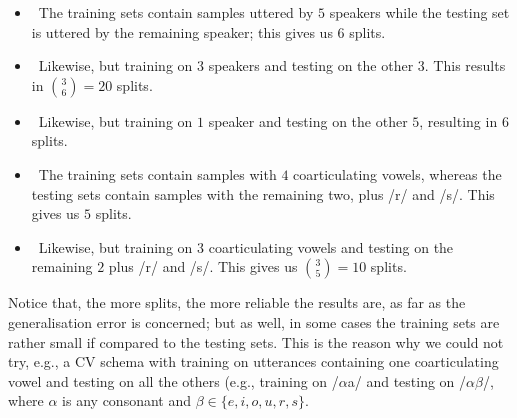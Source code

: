 \begin{itemize}

  \item \spka\ The training sets contain samples
  	uttered by $5$ speakers while the testing set is
  	uttered by the remaining speaker; this gives us $6$ splits.

  \item \spkb\ Likewise, but training on $3$ speakers and testing on the
  	other $3$. This results in $\binom{3}{6} = 20$ splits.

  \item \spkc\ Likewise, but training on $1$ speaker and testing on the
  	other $5$, resulting in $6$ splits.

  \item \coa\ The training sets contain samples
  	with $4$ coarticulating vowels, whereas the testing sets contain samples
  	with the remaining two, plus /r/ and /s/. This gives us $5$ splits.

  \item \cob\ Likewise, but training on $3$ coarticulating vowels and
  	testing on the remaining $2$ plus /r/ and /s/. This gives us
  	$\binom{3}{5} = 10$ splits.

\end{itemize}

Notice that, the more splits, the more reliable the results are, as far as the
generalisation error is concerned; but as well, in some cases the training sets
are rather small if compared to the testing sets. This is the reason why we could
not try, e.g., a CV schema with training on utterances containing
one coarticulating vowel and testing on all the others (e.g., training on
/$\alpha$a/ and testing on /$\alpha\beta$/, where $\alpha$ is any consonant
and $\beta \in \{e,i,o,u,r,s\}$.
